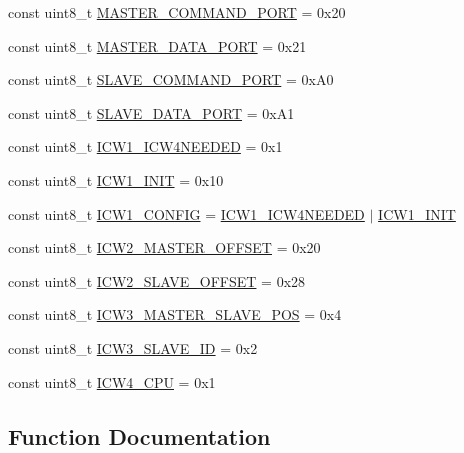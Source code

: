 \begin{DoxyCompactItemize}
\item 
const uint8\+\_\+t \hyperlink{namespace_p_i_c_aae56765eb24eb75e1498e22c05ac29ee}{M\+A\+S\+T\+E\+R\+\_\+\+C\+O\+M\+M\+A\+N\+D\+\_\+\+P\+O\+RT} = 0x20
\item 
const uint8\+\_\+t \hyperlink{namespace_p_i_c_a7b19e701740b8b1b19db1f1a14af63a6}{M\+A\+S\+T\+E\+R\+\_\+\+D\+A\+T\+A\+\_\+\+P\+O\+RT} = 0x21
\item 
const uint8\+\_\+t \hyperlink{namespace_p_i_c_a4cdc374612119bd13b1a28e4cc82864f}{S\+L\+A\+V\+E\+\_\+\+C\+O\+M\+M\+A\+N\+D\+\_\+\+P\+O\+RT} = 0x\+A0
\item 
const uint8\+\_\+t \hyperlink{namespace_p_i_c_a6e06fae4a0139a207173ff2b94be3283}{S\+L\+A\+V\+E\+\_\+\+D\+A\+T\+A\+\_\+\+P\+O\+RT} = 0x\+A1
\item 
const uint8\+\_\+t \hyperlink{namespace_p_i_c_a63beb0c60fdab8c997f42291a7c2baf5}{I\+C\+W1\+\_\+\+I\+C\+W4\+N\+E\+E\+D\+ED} = 0x1
\item 
const uint8\+\_\+t \hyperlink{namespace_p_i_c_a8bb2fc0a772eabbbf6adb002f578290e}{I\+C\+W1\+\_\+\+I\+N\+IT} = 0x10
\item 
const uint8\+\_\+t \hyperlink{namespace_p_i_c_aa3b99beaed95a8a51f1e855723e05d48}{I\+C\+W1\+\_\+\+C\+O\+N\+F\+IG} = \hyperlink{namespace_p_i_c_a63beb0c60fdab8c997f42291a7c2baf5}{I\+C\+W1\+\_\+\+I\+C\+W4\+N\+E\+E\+D\+ED} $\vert$ \hyperlink{namespace_p_i_c_a8bb2fc0a772eabbbf6adb002f578290e}{I\+C\+W1\+\_\+\+I\+N\+IT}
\item 
const uint8\+\_\+t \hyperlink{namespace_p_i_c_a4eada3349fe4b6740074b1adecdb080b}{I\+C\+W2\+\_\+\+M\+A\+S\+T\+E\+R\+\_\+\+O\+F\+F\+S\+ET} = 0x20
\item 
const uint8\+\_\+t \hyperlink{namespace_p_i_c_a33b48f750baf61bf1820e5b36ce44a48}{I\+C\+W2\+\_\+\+S\+L\+A\+V\+E\+\_\+\+O\+F\+F\+S\+ET} = 0x28
\item 
const uint8\+\_\+t \hyperlink{namespace_p_i_c_ade78b65e9f0859d0d5ca14df7148b305}{I\+C\+W3\+\_\+\+M\+A\+S\+T\+E\+R\+\_\+\+S\+L\+A\+V\+E\+\_\+\+P\+OS} = 0x4
\item 
const uint8\+\_\+t \hyperlink{namespace_p_i_c_abe9c403a4caa1dd885595bd27c803122}{I\+C\+W3\+\_\+\+S\+L\+A\+V\+E\+\_\+\+ID} = 0x2
\item 
const uint8\+\_\+t \hyperlink{namespace_p_i_c_a3d092deea6581b86dddc5fb5c7fde403}{I\+C\+W4\+\_\+\+C\+PU} = 0x1
\end{DoxyCompactItemize}


\subsection{Function Documentation}
\mbox{\label{namespace_p_i_c_a2a04fe95329faacc43f00ad30fe554b9}} 
